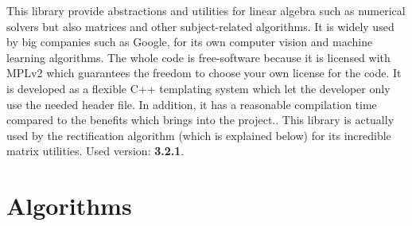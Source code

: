 This library provide abstractions and utilities for linear algebra such as numerical solvers but also matrices and other subject-related algorithms.
It is widely used by big companies such as Google, for its own computer vision and machine learning algorithms.
The whole code is free-software because it is licensed with MPLv2 which guarantees the freedom to choose your own license for the code. It is developed as a flexible C++ templating system which let the developer only use the needed header file. In addition, it has a reasonable compilation time compared to the benefits which brings into the project.\cite{eigeninfo}.
This library is actually used by the rectification algorithm (which is explained below) for its incredible matrix utilities.
\newline Used version: \textbf{3.2.1}.

\section{Algorithms}

